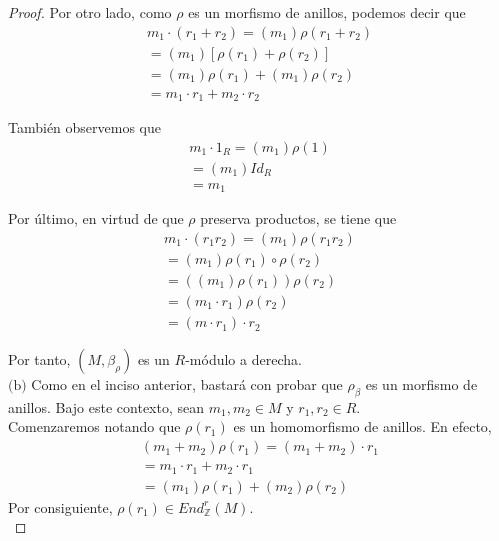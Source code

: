 \documentclass{article}
\newcommand{\lrprth}[1]{
    \left(#1\right)
}
\newcommand{\zend}[2]{
    End_{\mathbb{Z}}^{#2}\lrprth{#1}
}
\theoremstyle{definition}
\theoremstyle{plain}
\theoremstyle{plain}
\theoremstyle{definition}
\theoremstyle{definition}
\theoremstyle{definition}
\theoremstyle{definition}
\theoremstyle{definition}
\theoremstyle{definition}
\begin{document}
\begin{enumerate}[label=\textbf{Ej \arabic*.}]
\begin{proof}
Por otro lado, como $\rho$ es un morfismo de anillos, podemos decir que
\begin{align*}
m_{1} \cdot \lrprth{r_{1}+r_{2}}=\lrprth{m_{1}} \rho \lrprth{r_{1}+r_{2}}\\
=\lrprth{m_{1}}[\rho \lrprth{r_{1}} + \rho \lrprth{r_{2}}]\\
=\lrprth{m_{1}} \rho \lrprth{r_{1}} + \lrprth{m_{1}} \rho \lrprth{r_{2}}\\
=m_{1} \cdot r_{1} + m_{2} \cdot r_{2}
\end{align*}

También observemos que
\begin{align*}
m_{1} \cdot 1_{R}=\lrprth{m_{1}} \rho \lrprth{1}\\
=\lrprth{m_{1}}Id_{R}\\
=m_{1}
\end{align*}
	
Por último, en virtud de que $\rho$ preserva productos, se tiene que
\begin{align*}
m_{1} \cdot \lrprth{r_{1}r_{2}}=\lrprth{m_{1}} \rho \lrprth{r_{1}r_{2}}\\
=\lrprth{m_{1}} \rho \lrprth{r_{1}} \circ \rho \lrprth{r_{2}}\\
=\lrprth{\lrprth{m_{1}} \rho \lrprth{r_{1}}} \rho \lrprth{r_{2}}\\
=\lrprth{m_{1} \cdot r_{1}} \rho \lrprth{r_{2}}\\
=\lrprth{m \cdot r_{1}} \cdot r_{2}
\end{align*}
	
Por tanto, $\lrprth{M, \beta_{\rho}}$ es un $R$-módulo a derecha.\\

$\boxed{\text{(b)}}$ Como en el inciso anterior, bastará con probar que $\rho_{\beta}$ es un morfismo de anillos. Bajo este contexto, sean $m_{1},m_{2} \in M$ y $r_{1},r_{2} \in R$.\\
	
Comenzaremos notando que $\rho \lrprth{r_{1}}$ es un homomorfismo de anillos. En efecto,
\begin{align*}
\lrprth{m_{1}+m_{2}} \rho \lrprth{r_{1}}=\lrprth{m_{1}+m_{2}} \cdot r_{1}\\
=m_{1} \cdot r_{1} + m_{2} \cdot r_{1}\\
=\lrprth{m_{1}} \rho \lrprth{r_{1}} + \lrprth{m_{2}} \rho \lrprth{r_{2}}
\end{align*}
Por consiguiente, $\rho\lrprth{r_{1}}\in\zend{M}{r}$.\\
	

\end{proof}
\end{enumerate}
\end{document}
